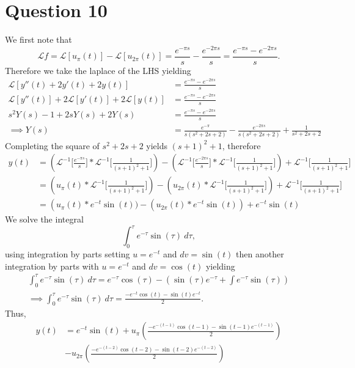 \documentclass[
	12pt,
	]{article}
\newcommand{\La}{\mathcal{L}}
\theoremstyle{definition}
\theoremstyle{definition}
\theoremstyle{definition}
\theoremstyle{definition}
\theoremstyle{definition}
\theoremstyle{example}
\theoremstyle{note}
\theoremstyle{remark}
\theoremstyle{example}
\begin{document}
				\section*{Question 10}
					We first note that $$\La f = \La [u_{\pi} (t)] - \La [u_{2\pi}(t)] = \frac{e^{-\pi s}}{s} - \frac{e^{-2\pi s}}{s} = \frac{e^{-\pi s} - e^{-2\pi s}}{s}.$$
					Therefore we take the laplace of the LHS yielding 
					\begin{align*}
					 \La [y''(t)  + 2y'(t) + 2y(t)] &=\frac{e^{-\pi s} - e^{-2\pi s}}{s} \\
					 \La[y''(t)] + 2\La[y'(t)] + 2\La [y(t)] &= \frac{e^{-\pi s} - e^{-2\pi s}}{s} \\
					 s^{2}Y(s) -1 + 2sY(s) + 2Y(s) &= \frac{e^{-\pi s} - e^{-2\pi s}}{s} \\
					 \implies Y(s) &= \frac{e^{-\pi }}{s (s^{2} + 2s + 2)} - \frac{e^{-2\pi s}}{s (s^{2} + 2s + 2)} + \frac{1}{s^{2} + 2s +2 }
					\end{align*}
					Completing the square of $s^{2} +2s +2$ yields $(s+1)^{2} +1$, therefore 
					\begin{align*}
					y(t) &= \left(\La^{-1} \bigg[\frac{e^{-\pi s}}{s}\bigg] \ast \La^{-1} \bigg[\frac{1}{(s+1)^{2} +1}\bigg]\right) - \left(\La^{-1}\bigg[\frac{e^{-2\pi s}}{s}\bigg] \ast \La^{-1} \bigg[\frac{1}{(s+1)^{2}+1}\bigg]\right) + \La^{-1}\bigg[\frac{1}{(s+1)^{2}+1}\bigg] \\
					&= \left(u_{\pi}(t) \ast \La^{-1} \bigg[\frac{1}{(s+1)^{2} +1}\bigg]\right) - \left(u_{2\pi} (t) \ast \La^{-1} \bigg[\frac{1}{(s+1)^{2}+1}\bigg]\right) + \La^{-1}\bigg[\frac{1}{(s+1)^{2}+1}\bigg] \\
					&= \left(u_{\pi}(t) \ast e^{-t}\sin(t)) - \left(u_{2\pi} (t) \ast e^{-t}\sin(t)\right) + e^{-t}\sin(t)
					\end{align*}
					We solve the integral 
					$$ \int_{0}^{\tau} e^{-\tau}\sin(\tau) \ d\tau,$$
					using integration by parts setting $u=e^{-t}$ and $dv = \sin(t)$ then another integration by parts with $u=e^{-t}$ and $dv=\cos(t)$ yielding
					\begin{gather*}
						\int_{0}^{\tau} e^{-\tau}\sin(\tau) \ d\tau = e^{-\tau}\cos(\tau) - \left(\sin(\tau)e^{-\tau} + \int e^{-\tau}\sin(\tau)\right) \\
						\implies \int_{0}^{\tau} e^{-\tau}\sin(\tau) \ d\tau = \frac{-e^{-t}\cos(t) - \sin(t)e^{-t}}{2}.
					\end{gather*}
					Thus, 
					\begin{align*}
					y(t) &= e^{-t}\sin(t) + u_{\pi}\left(\frac{-e^{-(t-1)}\cos(t-1) - \sin(t-1)e^{-(t-1)}}{2}\right) \\ &- u_{2\pi}\left(\frac{-e^{-(t-2)}\cos(t-2) - \sin(t-2)e^{-(t-2)}}{2}\right)
					\end{align*}
\end{document}
